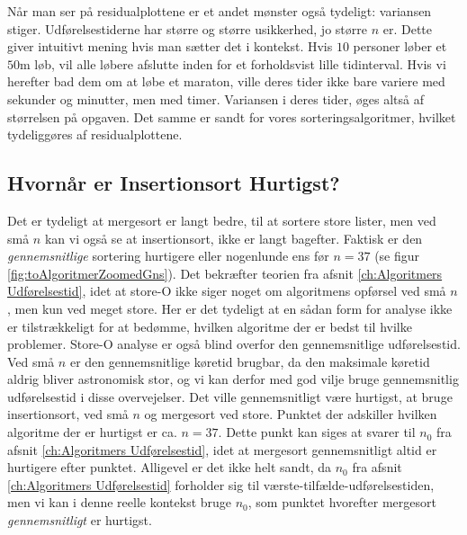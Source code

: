 Når man ser på residualplottene er et andet mønster også tydeligt: variansen stiger. Udførelsestiderne har større og større usikkerhed, jo større $n$ er. Dette giver intuitivt mening hvis man sætter det i kontekst. Hvis $10$ personer løber et $50$m løb, vil alle løbere afslutte inden for et forholdsvist lille tidinterval. Hvis vi herefter bad dem om at løbe et maraton, ville deres tider ikke bare variere med sekunder og minutter, men med timer. Variansen i deres tider, øges altså af størrelsen på opgaven. Det samme er sandt for vores sorteringsalgoritmer, hvilket tydeliggøres af residualplottene. 


\subsection{Hvornår er Insertionsort Hurtigst?}%
\label{sub:Store-O er Værste Tilfælde}
Det er tydeligt at mergesort er langt bedre, til at sortere store lister, men ved små $n$ kan vi også se at insertionsort, ikke er langt bagefter. Faktisk er den \emph{gennemsnitlige} sortering hurtigere eller nogenlunde ens før $n = 37$ (se figur \ref{fig:toAlgoritmerZoomedGns}). Det bekræfter teorien fra afsnit \ref{ch:Algoritmers Udførelsestid}, idet at store-O ikke siger noget om algoritmens opførsel ved små $n$, men kun ved meget store. Her er det tydeligt at en sådan form for analyse ikke er tilstrækkeligt for at bedømme, hvilken algoritme der er bedst til hvilke problemer. Store-O analyse er også blind overfor den gennemsnitlige udførelsestid. Ved små $n$ er den gennemsnitlige køretid brugbar, da den maksimale køretid aldrig bliver astronomisk stor, og vi kan derfor med god vilje bruge gennemsnitlig udførelsestid i disse overvejelser. Det ville gennemsnitligt være hurtigst, at bruge insertionsort, ved små $n$ og mergesort ved store. Punktet der adskiller hvilken algoritme der er hurtigst er ca. $n = 37$. Dette punkt kan siges at svarer til $n_0$ fra afsnit \ref{ch:Algoritmers Udførelsestid}, idet at mergesort gennemsnitligt altid er hurtigere efter punktet. Alligevel er det ikke helt sandt, da $n_0$ fra afsnit \ref{ch:Algoritmers Udførelsestid} forholder sig til værste-tilfælde-udførelsestiden, men vi kan i denne reelle kontekst bruge $n_0$, som punktet hvorefter mergesort \emph{gennemsnitligt} er hurtigst.




